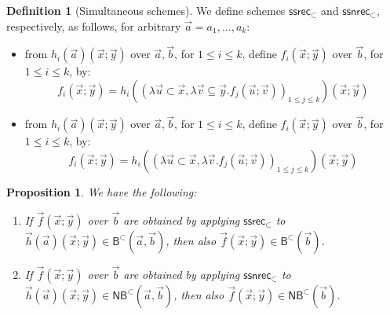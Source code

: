 \documentclass[manuscript,screen]{acmart}
\newtheorem{prop}[thm]{Proposition}
\theoremstyle{definition}
\newtheorem{defn}[thm]{Definition}
\theoremstyle{remark}
\newcommand{\permpref}{\subset}
\newcommand{\ssrecwfpo}[1]{\mathsf{ssrec}_{#1}}
\newcommand{\ssnrecwfpo}[1]{\mathsf{ssnrec}_{#1}}
\newcommand{\ssrecpp}{\ssrecwfpo{\permpref}}
\newcommand{\ssnrecpp}{\ssnrecwfpo{\permpref}}
\newcommand{\bc}{\mathsf{B}}
\newcommand{\bcwfpo}[1]{\bc^{#1}}
\newcommand{\nested}{\mathsf{N}}
\newcommand{\nbcwfpo}[1]{\nested\bcwfpo{#1}}
\newcommand{\bcpp}{\bcwfpo{\permpref}}
\newcommand{\nbcpp}{\nbcwfpo{\permpref}}
\begin{document}
\begin{defn}[Simultaneous schemes]
\label{defn:simultaneous-schemes}
We define schemes $\ssrecpp$ and $\ssnrecpp$, respectively, as follows, for arbitrary $\vec a = a_1, \dots, a_{k}$:
\begin{itemize}
    \item from $h_i(\vec a)(\vec x; \vec y)$ over $\vec a, \vec b$, for $1 \leq i\leq k$, define $f_i(\vec x;\vec y)$ over $\vec b$, for $1 \leq i \leq k$, by:
    \[
    f_i(\vec x; \vec y) = 
    h_i((\lambda \vec u \permpref \vec x, \lambda \vec v\subseteq \vec y. f_j(\vec u; \vec v))_{1 \leq j\leq  k})(\vec x; \vec y)
    \]
    \item from $h_i(\vec a)(\vec x; \vec y)$ over $\vec a, \vec b$, for $1\leq i \leq k$, define $f_i(\vec x;\vec y)$ over $\vec b$, for $1 \leq i \leq  k$, by:
    \[
    f_i(\vec x; \vec y) = 
    h_i((\lambda \vec u \permpref \vec x, \lambda \vec v. f_j(\vec u; \vec v))_{1 \leq j \leq k})(\vec x; \vec y)
    \]
\end{itemize}
\end{defn}
\begin{prop} \label{prop:simultaneous-recursion-admissible}
We have the following:
\begin{enumerate}
    \item\label{item:sim-rec-admiss-bcpp} If $\vec f(\vec x;\vec y)$ over $\vec b$ are obtained by applying  $\ssrecpp$ to $\vec h(\vec a)(\vec x;\vec y) \in \bcpp(\vec a,\vec b)$, then also $\vec f(\vec x;\vec y) \in \bcpp (\vec b)$.
\item\label{item:sim-rec-admiss-nbcpp-sbcpp}
If $\vec f(\vec x;\vec y)$ over $\vec b$ are obtained by applying  $\ssnrecpp$ to $\vec h(\vec a)(\vec x;\vec y) \in \nbcpp(\vec a,\vec b)$, then also $\vec f(\vec x;\vec y) \in \nbcpp (\vec b)$.
\end{enumerate}
\end{prop}
\end{document}

